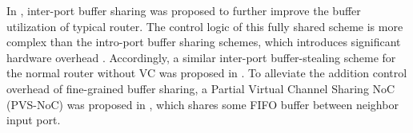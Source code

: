 \documentclass[10pt,conference]{IEEEtran}
\begin{document}
In \cite{Neishaburi:2009:RAN:1531542.1531658}\cite{5770788}, inter-port buffer sharing was proposed to further improve the buffer utilization of typical router. The control logic of this fully shared scheme is more complex than the intro-port buffer sharing schemes, which introduces significant hardware overhead \cite{Park2008}. Accordingly, a similar inter-port buffer-stealing scheme for the normal router without VC was proposed in \cite{5722177}. To alleviate the addition control overhead of fine-grained buffer sharing, a Partial Virtual Channel Sharing NoC (PVS-NoC) was proposed in \cite{5739053}, which shares some FIFO buffer between neighbor input port.

\end{document}
